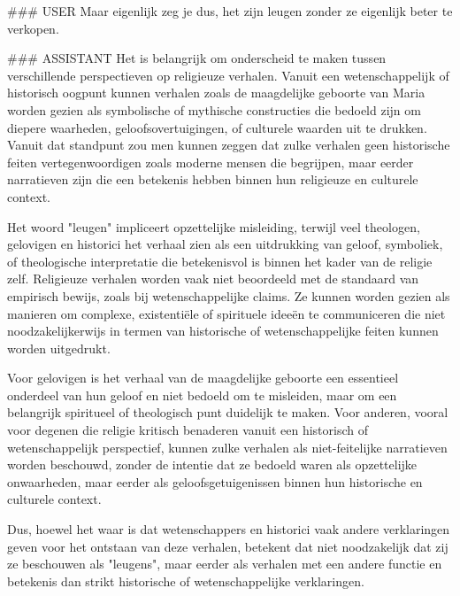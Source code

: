 \#\#\# USER
Maar eigenlijk zeg je dus, het zijn leugen zonder ze eigenlijk beter te verkopen.

\#\#\# ASSISTANT
Het is belangrijk om onderscheid te maken tussen verschillende perspectieven op religieuze verhalen. Vanuit een wetenschappelijk of historisch oogpunt kunnen verhalen zoals de maagdelijke geboorte van Maria worden gezien als symbolische of mythische constructies die bedoeld zijn om diepere waarheden, geloofsovertuigingen, of culturele waarden uit te drukken. Vanuit dat standpunt zou men kunnen zeggen dat zulke verhalen geen historische feiten vertegenwoordigen zoals moderne mensen die begrijpen, maar eerder narratieven zijn die een betekenis hebben binnen hun religieuze en culturele context.

Het woord "leugen" impliceert opzettelijke misleiding, terwijl veel theologen, gelovigen en historici het verhaal zien als een uitdrukking van geloof, symboliek, of theologische interpretatie die betekenisvol is binnen het kader van de religie zelf. Religieuze verhalen worden vaak niet beoordeeld met de standaard van empirisch bewijs, zoals bij wetenschappelijke claims. Ze kunnen worden gezien als manieren om complexe, existentiële of spirituele ideeën te communiceren die niet noodzakelijkerwijs in termen van historische of wetenschappelijke feiten kunnen worden uitgedrukt.

Voor gelovigen is het verhaal van de maagdelijke geboorte een essentieel onderdeel van hun geloof en niet bedoeld om te misleiden, maar om een belangrijk spiritueel of theologisch punt duidelijk te maken. Voor anderen, vooral voor degenen die religie kritisch benaderen vanuit een historisch of wetenschappelijk perspectief, kunnen zulke verhalen als niet-feitelijke narratieven worden beschouwd, zonder de intentie dat ze bedoeld waren als opzettelijke onwaarheden, maar eerder als geloofsgetuigenissen binnen hun historische en culturele context.

Dus, hoewel het waar is dat wetenschappers en historici vaak andere verklaringen geven voor het ontstaan van deze verhalen, betekent dat niet noodzakelijk dat zij ze beschouwen als "leugens", maar eerder als verhalen met een andere functie en betekenis dan strikt historische of wetenschappelijke verklaringen.
